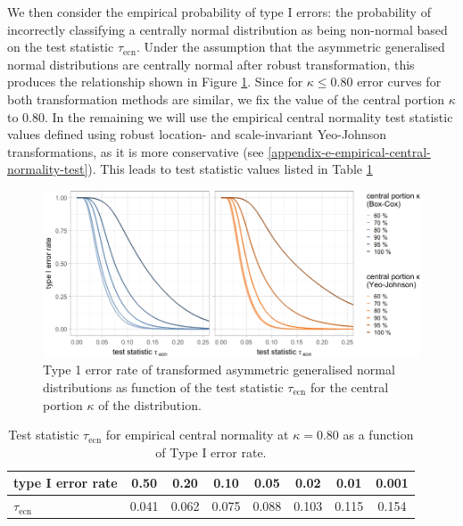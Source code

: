 \documentclass[preprint,12pt,authoryear]{elsarticle}
\begin{document}
We then consider the empirical probability of type I errors: the
probability of incorrectly classifying a centrally normal distribution
as being non-normal based on the test statistic \(\tau_{\text{ecn}}\).
Under the assumption that the asymmetric generalised normal
distributions are centrally normal after robust transformation, this
produces the relationship shown in Figure
\ref{fig:empirical-central-normality-type-1-error-rate}. Since for
\(\kappa \leq 0.80\) error curves for both transformation methods are
similar, we fix the value of the central portion \(\kappa\) to 0.80. In
the remaining we will use the empirical central normality test statistic
values defined using robust location- and scale-invariant Yeo-Johnson
transformations, as it is more conservative (see \ref{appendix-e-empirical-central-normality-test}). This leads
to test statistic values listed in Table
\ref{tab:empirical-central-normality}

\begin{figure}

{\centering \includegraphics[width=1\linewidth]{figure_6} 

}

\caption{Type 1 error rate of transformed asymmetric generalised normal distributions as function of the test statistic $\tau_{\text{ecn}}$ for the central portion $\kappa$ of the distribution.}\label{fig:empirical-central-normality-type-1-error-rate}
\end{figure}

\begin{table}
\begin{center}
\caption{Test statistic $\tau_{\text{ecn}}$ for empirical central normality at $\kappa = 0.80$ as a function of Type I error rate.}
\label{tab:empirical-central-normality}
\begin{tabular}{l | c c c c c c c}

\toprule
type I error rate & 0.50 & 0.20 & 0.10 & 0.05 & 0.02 & 0.01 & 0.001 \\

\midrule
$\tau_{\text{ecn}}$ & 0.041 & 0.062 & 0.075 & 0.088 & 0.103 & 0.115 & 0.154 \\
\bottomrule
\end{tabular}
\end{center}
\end{table}
\end{document}
